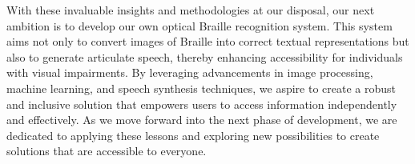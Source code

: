 With these invaluable insights and methodologies at our disposal, our next ambition is to develop our own optical Braille recognition system. This system aims not only to convert images of Braille into correct textual representations but also to generate articulate speech, thereby enhancing accessibility for individuals with visual impairments. By leveraging advancements in image processing, machine learning, and speech synthesis techniques, we aspire to create a robust and inclusive solution that empowers users to access information independently and effectively. As we move forward into the next phase of development, we are dedicated to applying these lessons and exploring new possibilities to create solutions that are accessible to everyone.  